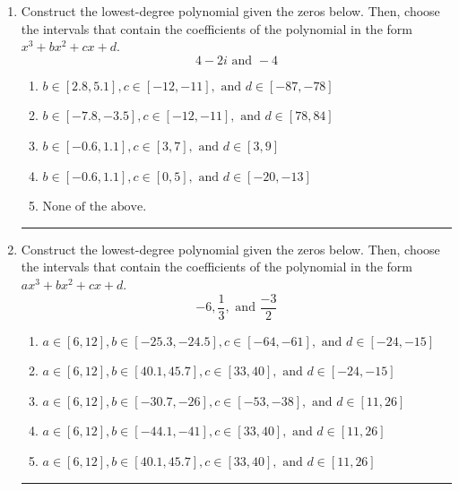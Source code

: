 \documentclass[14pt]{extbook}
\newcommand{\litem}[1]{\item#1\hspace*{-1cm}\rule{\textwidth}{0.4pt}}
\begin{document}
\begin{enumerate}
\litem{
Construct the lowest-degree polynomial given the zeros below. Then, choose the intervals that contain the coefficients of the polynomial in the form $x^3+bx^2+cx+d$.\[ 4 - 2 i \text{ and } -4 \]\begin{enumerate}[label=\Alph*.]
\item \( b \in [2.8, 5.1], c \in [-12, -11], \text{ and } d \in [-87, -78] \)
\item \( b \in [-7.8, -3.5], c \in [-12, -11], \text{ and } d \in [78, 84] \)
\item \( b \in [-0.6, 1.1], c \in [3, 7], \text{ and } d \in [3, 9] \)
\item \( b \in [-0.6, 1.1], c \in [0, 5], \text{ and } d \in [-20, -13] \)
\item \( \text{None of the above.} \)

\end{enumerate} }
\litem{
Construct the lowest-degree polynomial given the zeros below. Then, choose the intervals that contain the coefficients of the polynomial in the form $ax^3+bx^2+cx+d$.\[ -6, \frac{1}{3}, \text{ and } \frac{-3}{2} \]\begin{enumerate}[label=\Alph*.]
\item \( a \in [6, 12], b \in [-25.3, -24.5], c \in [-64, -61], \text{ and } d \in [-24, -15] \)
\item \( a \in [6, 12], b \in [40.1, 45.7], c \in [33, 40], \text{ and } d \in [-24, -15] \)
\item \( a \in [6, 12], b \in [-30.7, -26], c \in [-53, -38], \text{ and } d \in [11, 26] \)
\item \( a \in [6, 12], b \in [-44.1, -41], c \in [33, 40], \text{ and } d \in [11, 26] \)
\item \( a \in [6, 12], b \in [40.1, 45.7], c \in [33, 40], \text{ and } d \in [11, 26] \)


\end{enumerate}}
\end{enumerate}
\end{document}
